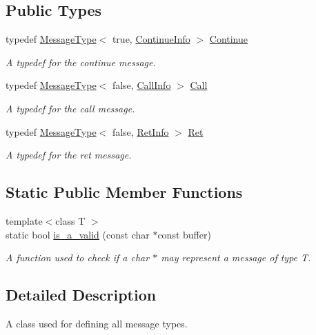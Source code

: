 \subsection*{Public Types}
\begin{DoxyCompactItemize}
\item 
typedef \hyperlink{struct_message_1_1_message_type}{Message\+Type}$<$ true, \hyperlink{struct_message_1_1_continue_info}{Continue\+Info} $>$ \hyperlink{class_message_a04de61b84a209cdf372b6f53f3adf7c4}{Continue}
\begin{DoxyCompactList}\small\item\em A typedef for the continue message. \end{DoxyCompactList}\item 
typedef \hyperlink{struct_message_1_1_message_type}{Message\+Type}$<$ false, \hyperlink{struct_message_1_1_call_info}{Call\+Info} $>$ \hyperlink{class_message_a0fd0ed431cb0d672045d09368a5d2126}{Call}
\begin{DoxyCompactList}\small\item\em A typedef for the call message. \end{DoxyCompactList}\item 
typedef \hyperlink{struct_message_1_1_message_type}{Message\+Type}$<$ false, \hyperlink{struct_message_1_1_ret_info}{Ret\+Info} $>$ \hyperlink{class_message_a146628035f5a0723cb04f7a328858e34}{Ret}
\begin{DoxyCompactList}\small\item\em A typedef for the ret message. \end{DoxyCompactList}\end{DoxyCompactItemize}
\subsection*{Static Public Member Functions}
\begin{DoxyCompactItemize}
\item 
{\footnotesize template$<$class T $>$ }\\static bool \hyperlink{class_message_ada73859c8d199a7925b0ba3999cc3eef}{is\+\_\+a\+\_\+valid} (const char $\ast$const buffer)
\begin{DoxyCompactList}\small\item\em A function used to check if a char $\ast$ may represent a message of type T. \end{DoxyCompactList}\end{DoxyCompactItemize}


\subsection{Detailed Description}
A class used for defining all message types. 

